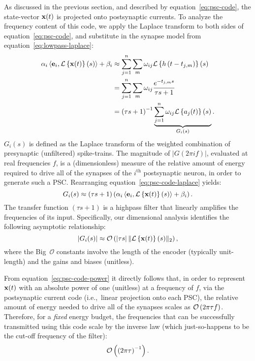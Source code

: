 As discussed in the previous section, and described by equation~\ref{eq:psc-code}, the state-vector $\mathbf{x}(t)$ is projected onto postsynaptic currents.
To analyze the frequency content of this code, we apply the Laplace transform to both sides of equation~\ref{eq:psc-code}, and substitute in the synapse model from equation~\ref{eq:lowpass-laplace}:
\begin{equation} \label{eq:psc-code-laplace}
\begin{aligned}
\alpha_i \left\langle \mathbf{e}_i\text{,}\, \mathcal{L}\left\{{ \mathbf{x}(t) }\right\}(s) \right\rangle + \beta_i &\approx \sum_{j=1}^n \sum_m \omega_{ij} \mathcal{L}\left\{{ h \left( t - t_{j\text{,}m} \right) }\right\}(s) \\
&= \sum_{j=1}^n \sum_m \omega_{ij} \frac{e^{-{t_{j\text{,}m}s}}}{\tau s + 1} \\ 
&= \left( \tau s + 1 \right)^{-1} \underbrace{ \sum_{j=1}^n \omega_{ij} \mathcal{L}\left\{{ a_j(t) }\right\}(s) }_{G_i(s)} \text{.}
\end{aligned}
\end{equation}
$G_i(s)$ is defined as the Laplace transform of the weighted combination of presynaptic (unfiltered) spike-trains.
The magnitude of $| G(2\pi i f) |$, evaluated at real frequencies $f$, is a (dimensionless) measure of the relative amount of energy required to drive all of the synapses of the $i^\text{th}$ postsynaptic neuron, in order to generate such a PSC.
Rearranging equation~\ref{eq:psc-code-laplace} yields:
\begin{equation} \label{eq:psc-code-rearranged}
G_i(s) \approx \left( \tau s + 1 \right) \left( \alpha_i \left\langle \mathbf{e}_i\text{,}\, \mathcal{L}\left\{{ \mathbf{x}(t) }\right\}(s) \right\rangle + \beta_i \right) \text{.}
\end{equation}
The transfer function $\left( \tau s + 1 \right)$ is a highpass filter that linearly amplifies the frequencies of its input.
Specifically, our dimensional analysis identifies the following asymptotic relationship:
\begin{equation} \label{eq:psc-code-power}
| G_i(s) | \approx \mathcal{O}\left({ \left| \tau s \right| \| \mathcal{L}\left\{{ \mathbf{x}(t) }\right\}(s) \|_2 }\right) \text{,}
\end{equation}
where the Big~$\mathcal{O}$ constants involve the length of the encoder (typically unit-length) and the gains and biases (unitless).

From equation~\ref{eq:psc-code-power} it directly follows that, in order to represent $\mathbf{x}(t)$ with an absolute power of one (unitless) at a frequency of $f$, via the postsynaptic current code (i.e.,~linear projection onto each PSC), the relative amount of energy needed to drive all of the synapses scales as $\mathcal{O}\left({2 \pi \tau f }\right)$.
Therefore, for a \emph{fixed} energy budget, the frequencies that can be successfully transmitted using this code scale by the inverse law (which just-so-happens to be the cut-off frequency of the filter):
\begin{equation} \label{eq:low-frequency-representation}
\mathcal{O}\left({\left( 2 \pi \tau \right)^{-1}}\right) \text{.}
\end{equation}

